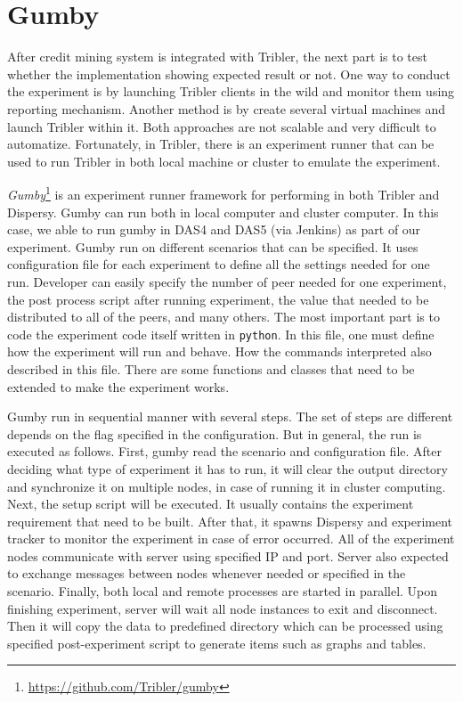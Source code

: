 
\section{Gumby}
\label{section:gumby}
After credit mining system is integrated with Tribler, the next part is to test whether the implementation showing expected result or not. One way to conduct the experiment is by launching Tribler clients in the wild and monitor them using reporting mechanism. Another method is by create several virtual machines and launch Tribler within it. Both approaches are not scalable and very difficult to automatize. Fortunately, in Tribler, there is an experiment runner that can be used to run Tribler in both local machine or cluster to emulate the experiment.

\textit{Gumby}\footnote{\url{https://github.com/Tribler/gumby}} is an experiment runner framework for performing in both Tribler and Dispersy. Gumby can run both in local computer and cluster computer. In this case, we able to run gumby in DAS4 and DAS5 (via Jenkins) as part of our experiment. Gumby run on different scenarios that can be specified. It uses configuration file for each experiment to define all the settings needed for one run. Developer can easily specify the number of peer needed for one experiment, the post process script after running experiment, the value that needed to be distributed to all of the peers, and many others. The most important part is to code the experiment code itself written in \texttt{python}. In this file, one must define how the experiment will run and behave. How the commands interpreted also described in this file. There are some functions and classes that need to be extended to make the experiment works.

Gumby run in sequential manner with several steps. The set of steps are different depends on the flag specified in the configuration. But in general, the run is executed as follows. First, gumby read the scenario and configuration file. After deciding what type of experiment it has to run, it will clear the output directory and synchronize it on multiple nodes, in case of running it in cluster computing. Next, the setup script will be executed. It usually contains the experiment requirement that need to be built. After that, it spawns Dispersy and experiment tracker to monitor the experiment in case of error occurred. All of the experiment nodes communicate with server using specified IP and port. Server also expected to exchange messages between nodes whenever needed or specified in the scenario. Finally, both local and remote processes are started in parallel. Upon finishing experiment, server will wait all node instances to exit and disconnect. Then it will copy the data to predefined directory which can be processed using specified post-experiment script to generate items such as graphs and tables.

